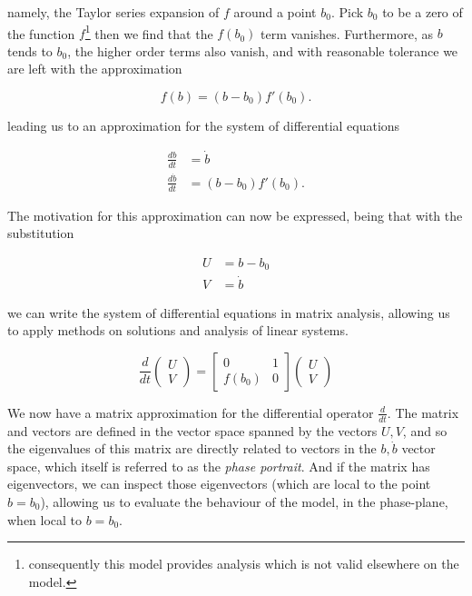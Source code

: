 \documentclass{article}
\begin{document}
namely, the Taylor series expansion of $f$ around a point $b_0$.
Pick $b_0$ to be a zero of the function $f$\footnote{consequently this model provides analysis which is not valid elsewhere on the model.}
then we find that the $f(b_0)$ term vanishes.
Furthermore, as $b$ tends to $b_0$, the higher order terms also vanish,
and with reasonable tolerance we are left with the approximation

\begin{equation}
    f(b) = (b-b_0)f'(b_0).
\end{equation}

leading us to an approximation for the system of differential equations

\begin{align}
    \frac{db}{dt} &= \dot{b} \\
    \frac{d\dot{b}}{dt} &= (b-b_0)f'(b_0).
\end{align}

The motivation for this approximation can now be expressed,
being that with the substitution

\begin{align}
    U &= b - b_0 \\
    V &= \dot{b}
\end{align}

we can write the system of differential equations in matrix analysis,
allowing us to apply methods on solutions and analysis of linear systems.

\begin{equation}
    \frac{d}{dt}\begin{pmatrix}
        U \\
        V
    \end{pmatrix} = \begin{bmatrix}
        0 & 1 \\
        f(b_0) & 0
    \end{bmatrix} \begin{pmatrix}
        U \\
        V
    \end{pmatrix}
    \label{eqn:matrix}
\end{equation}

We now have a matrix approximation for the differential operator $\frac{d}{dt}$.
The matrix and vectors are defined in the vector space spanned by the vectors $U,V$,
and so the eigenvalues of this matrix are directly related to vectors in the $b,\dot{b}$ vector space,
which itself is referred to as the \textit{phase portrait}.
And if the matrix has eigenvectors, we can inspect those eigenvectors (which are local to the point $b=b_0$),
allowing us to evaluate the behaviour of the model, in the phase-plane,
when local to $b=b_0$.
\end{document}
